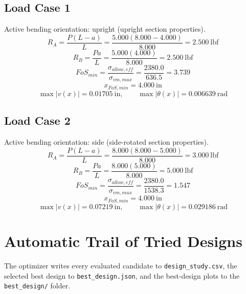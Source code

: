 \documentclass[11pt]{article}
\begin{document}
\subsection*{Load Case 1}
Active bending orientation: upright (upright section properties).
\[R_A = \frac{P(L-a)}{L} = \frac{5.000(8.000-4.000)}{8.000} = 2.500\ \mathrm{lbf}\]
\[R_B = \frac{Pa}{L} = \frac{5.000(4.000)}{8.000} = 2.500\ \mathrm{lbf}\]
\[FoS_{min} = \frac{\sigma_{allow,eff}}{\sigma_{vm,max}} = \frac{2380.0}{636.5} = 3.739\]
\[x_{FoS,min} = 4.000\ \mathrm{in}\]
\[\max |v(x)| = 0.01705\ \mathrm{in}, \qquad \max |\theta(x)| = 0.006639\ \mathrm{rad}\]
\subsection*{Load Case 2}
Active bending orientation: side (side-rotated section properties).
\[R_A = \frac{P(L-a)}{L} = \frac{8.000(8.000-5.000)}{8.000} = 3.000\ \mathrm{lbf}\]
\[R_B = \frac{Pa}{L} = \frac{8.000(5.000)}{8.000} = 5.000\ \mathrm{lbf}\]
\[FoS_{min} = \frac{\sigma_{allow,eff}}{\sigma_{vm,max}} = \frac{2380.0}{1538.3} = 1.547\]
\[x_{FoS,min} = 4.000\ \mathrm{in}\]
\[\max |v(x)| = 0.07219\ \mathrm{in}, \qquad \max |\theta(x)| = 0.029186\ \mathrm{rad}\]

\section*{Automatic Trail of Tried Designs}
The optimizer writes every evaluated candidate to \texttt{design\_study.csv}, the selected best design to \texttt{best\_design.json}, and the best-design plots to the \texttt{best\_design/} folder.
\end{document}
